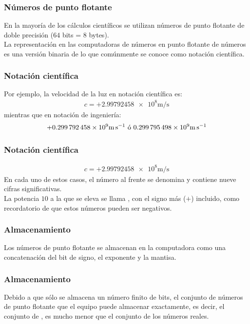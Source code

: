\documentclass[12pt]{beamer}
\begin{document}
\begin{frame}
\frametitle{Números de punto flotante}
En la mayoría de los cálculos científicos se utilizan números de punto flotante de doble precisión ($64$ bits = $8$ bytes).
\\
\bigskip
\pause
La representación en las computadoras de números en punto flotante de números es una versión binaria de lo que comúnmente se conoce como notación científica.
\end{frame}
\begin{frame}
\frametitle{Notación científica}
Por ejemplo, la velocidad de la luz en notación científica es:
\pause
\begin{align*}
c = + \num{2.99792458e8} \si{\meter\per\second}
\end{align*}
\pause
mientras que en notación de ingeniería:
\pause
\begin{align*}
+ \num{	0.299792458e9} \si{\meter\per\second} \text{ ó } \num{0.299795498E9} \si{\meter\per\second} 
\end{align*}
\end{frame}
\begin{frame}
\frametitle{Notación científica}
\begin{align*}
c = + \num{2.99792458e8} \si{\meter\per\second}
\end{align*}
En cada uno de estos casos, el número al frente se denomina  y contiene nueve cifras significativas.
\\
\bigskip
\pause
La potencia $10$ a la que se eleva se llama , con el signo más ($+$) incluido, como recordatorio de que estos números pueden ser negativos.
\end{frame}
\begin{frame}
\frametitle{Almacenamiento}
Los números de punto flotante se almacenan en la computadora como una concatenación del bit de signo, el exponente y la mantisa.
\end{frame}
\begin{frame}
\frametitle{Almacenamiento}
Debido a que sólo se almacena un número finito de bits, el conjunto de números de punto flotante que el equipo puede almacenar exactamente, es decir, el conjunto de , es mucho menor que el conjunto de los números reales.
\end{frame}
\end{document}
